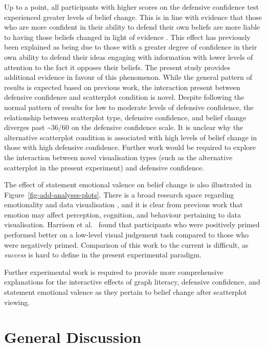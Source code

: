 \documentclass[../main.tex]{subfiles}
\begin{document}
Up to a point, all participants with higher scores on the defensive
confidence test experienced greater levels of belief change. This is in
line with evidence that those who are more confident in their ability to
defend their own beliefs are more liable to having those beliefs changed
in light of evidence \cite{albarracin_2004}. This effect has previously
been explained as being due to those with a greater degree of confidence
in their own ability to defend their ideas engaging with information
with lower levels of attention to the fact it opposes their beliefs. The
present study provides additional evidence in favour of this phenomenon.
While the general pattern of results is expected based on previous work,
the interaction present between defensive confidence and scatterplot
condition is novel. Despite following the normal pattern of results for
low to moderate levels of defensive confidence, the relationship between
scatterplot type, defensive confidence, and belief change diverges past
\sim 36/60 on the defensive confidence scale. It is unclear why the
alternative scatterplot condition is associated with high levels of
belief change in those with high defensive confidence. Further work
would be required to explore the interaction between novel visualisation
types (such as the alternative scatterplot in the present experiment)
and defensive confidence.

The effect of statement emotional valence on belief change is also
illustrated in Figure~\ref{fig-add-analyses-plots}. There is a broad
research space regarding emotionality and data visualisation
\cite{lan_2024}, and it is clear from previous work that emotion may
affect perception, cognition, and behaviour
\cite{phelps_2006, harrison_2013, thoresen_2016} pertaining to data
visualisation. Harrison et al.~\cite{harrison_2013} found that
participants who were positively primed performed better on a low-level
visual judgement task compared to those who were negatively primed.
Comparison of this work to the current is difficult, as \emph{success}
is hard to define in the present experimental paradigm.

Further experimental work is required to provide more comprehensive
explanations for the interactive effects of graph literacy, defensive
confidence, and statement emotional valence as they pertain to belief
change after scatterplot viewing.

\section{General Discussion}\label{general-discussion-e5}
\end{document}
